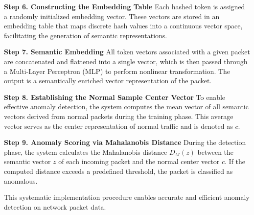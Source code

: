 \begin{ZhChapter}
\textbf{Step 6. Constructing the Embedding Table}
Each hashed token is assigned a randomly initialized embedding vector. These vectors are stored in an embedding table that maps discrete hash values into a continuous vector space, facilitating the generation of semantic representations.

\textbf{Step 7. Semantic Embedding}
All token vectors associated with a given packet are concatenated and flattened into a single vector, which is then passed through a Multi-Layer Perceptron (MLP) to perform nonlinear transformation. The output is a semantically enriched vector representation of the packet.

\textbf{Step 8. Establishing the Normal Sample Center Vector}
To enable effective anomaly detection, the system computes the mean vector of all semantic vectors derived from normal packets during the training phase. This average vector serves as the center representation of normal traffic and is denoted as $c$.

\textbf{Step 9. Anomaly Scoring via Mahalanobis Distance}
During the detection phase, the system calculates the Mahalanobis distance $D_M(z)$ between the semantic vector $z$ of each incoming packet and the normal center vector $c$. If the computed distance exceeds a predefined threshold, the packet is classified as anomalous.

This systematic implementation procedure enables accurate and efficient anomaly detection on network packet data.


\end{ZhChapter}